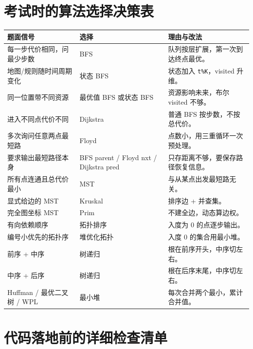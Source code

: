 \documentclass[10pt,a4paper,fontset=none]{ctexart}
\begin{document}
\section{考试时的算法选择决策表}

\begin{longtable}{L{4.2cm}L{4cm}L{6cm}}
\toprule
\textbf{题面信号} & \textbf{选择} & \textbf{理由与改法} \\
\midrule
每一步代价相同，问最少步数 & BFS & 队列按层扩展，第一次到达终点最优。\\
地图/规则随时间周期变化 & 状态 BFS & 状态加入 \texttt{t\%K}，visited 升维。\\
同一位置带不同资源 & 最优值 BFS 或状态 BFS & 资源影响未来，布尔 visited 不够。\\
进入不同点代价不同 & Dijkstra & 普通 BFS 按步数，不按总代价。\\
多次询问任意两点最短路 & Floyd & 点数小，用三重循环一次预处理。\\
要求输出最短路径本身 & BFS parent / Floyd nxt / Dijkstra pred & 只存距离不够，要保存路径恢复信息。\\
所有点连通且总代价最小 & MST & 与从某点出发最短路无关。\\
显式给边的 MST & Kruskal & 排序边 + 并查集。\\
完全图坐标 MST & Prim & 不建全边，动态算边权。\\
有向依赖顺序 & 拓扑排序 & 入度为 0 的点逐步输出。\\
编号小优先的拓扑序 & 堆优化拓扑 & 入度 0 的集合用最小堆。\\
前序 + 中序 & 树递归 & 根在前序开头，中序切左右。\\
中序 + 后序 & 树递归 & 根在后序末尾，中序切左右。\\
Huffman / 最优二叉树 / WPL & 最小堆 & 每次合并两个最小，累计合并值。\\
\bottomrule
\end{longtable}

\section{代码落地前的详细检查清单}
\end{document}
